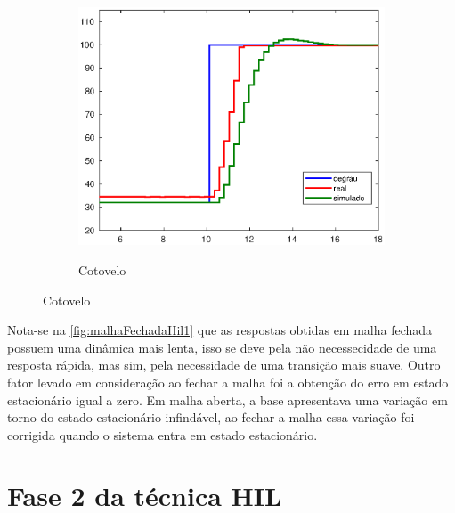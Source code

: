 \begin{figure}[h!]\ContinuedFloat
  \begin{subfigure}{\textwidth}
    \centering
    \caption{Cotovelo}
    \includegraphics[width = 0.55\columnwidth]{Imagens/forearm_mf_simul}
    \label{fig:forearm_mf_simul}
  \end{subfigure}%

\end{figure}


Nota-se na \autoref{fig:malhaFechadaHil1} que as respostas obtidas em malha fechada possuem uma dinâmica mais lenta,
isso se deve pela não necessecidade de uma resposta rápida, mas sim, pela necessidade de uma transição mais suave. Outro fator
levado em consideração ao fechar a malha foi a obtenção do erro em estado estacionário igual a zero. Em malha aberta, a base 
apresentava uma variação em torno do estado estacionário infindável, ao fechar a malha essa variação foi corrigida quando o
sistema entra em estado estacionário.

\section{Fase 2 da técnica HIL}

